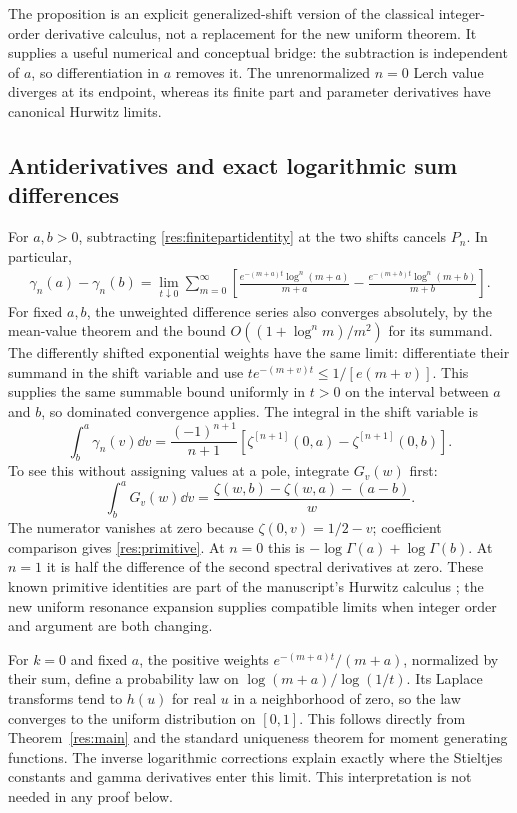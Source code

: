 The proposition is an explicit generalized-shift version of the classical
integer-order derivative calculus, not a replacement for the new uniform
theorem. It supplies a useful numerical and conceptual bridge: the
subtraction is independent of $a$, so differentiation in $a$ removes it.
The unrenormalized $n=0$ Lerch value diverges at its endpoint, whereas its
finite part and parameter derivatives have canonical Hurwitz limits.

\subsection{Antiderivatives and exact logarithmic sum differences}
For $a,b>0$, subtracting \eqref{res:finitepartidentity} at the two shifts
cancels $P_n$. In particular,
\begin{align}
 \gamma_n(a)-\gamma_n(b)
 =\lim_{t\downarrow0}\sum_{m=0}^{\infty}
  \left[
  \frac{e^{-(m+a)t}\log^n(m+a)}{m+a}
 -\frac{e^{-(m+b)t}\log^n(m+b)}{m+b}\right].
 \label{res:shiftlimit}
\end{align}
For fixed $a,b$, the unweighted difference series also converges absolutely,
by the mean-value theorem and the bound
$O((1+\log^n m)/m^2)$ for its summand. The differently shifted exponential
weights have the same limit: differentiate their summand in the shift
variable and use $t e^{-(m+v)t}\leq1/[e(m+v)]$. This supplies the same
summable bound uniformly in $t>0$ on the interval between $a$ and $b$,
so dominated convergence applies. The integral in the shift variable is
\begin{equation}\label{res:primitive}
 \int_b^a\gamma_n(v)\dd v
  =\frac{(-1)^{n+1}}{n+1}
     \left[\zeta^{[n+1]}(0,a)-\zeta^{[n+1]}(0,b)\right].
\end{equation}
To see this without assigning values at a pole, integrate $G_v(w)$ first:
\begin{equation}\label{res:intG}
 \int_b^a G_v(w)\dd v
  =\frac{\zeta(w,b)-\zeta(w,a)-(a-b)}w.
\end{equation}
The numerator vanishes at zero because $\zeta(0,v)=1/2-v$; coefficient
comparison gives \eqref{res:primitive}. At $n=0$ this is
$-\log\Gamma(a)+\log\Gamma(b)$. At $n=1$ it is half the difference of
the second spectral derivatives at zero. These known primitive identities
are part of the manuscript's Hurwitz calculus \cite{repoIntegration}; the
new uniform resonance expansion supplies compatible limits when integer
order and argument are both changing.

\begin{remark}
For $k=0$ and fixed $a$, the positive weights
$e^{-(m+a)t}/(m+a)$, normalized by their sum, define a probability law on
$\log(m+a)/\log(1/t)$. Its Laplace transforms tend to $h(u)$ for real $u$
in a neighborhood of zero, so the law converges to the uniform distribution
on $[0,1]$. This follows directly from Theorem~\ref{res:main} and the
standard uniqueness theorem for moment generating functions. The inverse
logarithmic corrections explain exactly where the Stieltjes constants and
gamma derivatives enter this limit. This interpretation is not needed in
any proof below.
\end{remark}
